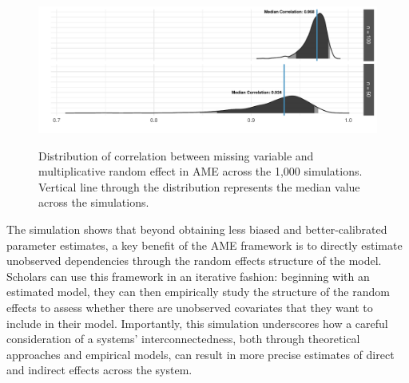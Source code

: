 \begin{figure}
	\centering
	\caption{Distribution of correlation between missing variable and multiplicative random effect in AME across the 1,000 simulations. Vertical line through the distribution represents the median value across the simulations.}
	\label{fig:ameCorr}
	\includegraphics[width=1\textwidth]{graphics/ameSimCorr.pdf} \\
\end{figure}

The simulation shows that beyond obtaining less biased and better-calibrated parameter estimates, a key benefit of the AME framework is to directly estimate unobserved dependencies through the random effects structure of the model. Scholars can use this framework in an iterative fashion: beginning with an estimated model, they can then empirically study the structure of the random effects to assess whether there are unobserved covariates that they want to include in their model. Importantly, this simulation underscores how a careful consideration of a systems' interconnectedness, both through theoretical approaches and empirical models, can result in more precise estimates of direct and indirect effects across the system.

